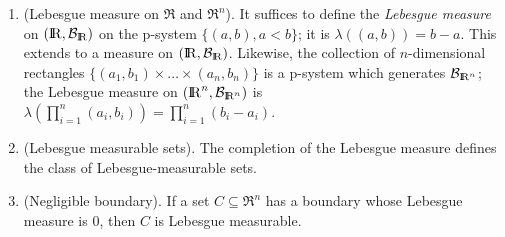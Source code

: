 \documentclass[a4paper,10pt]{article}
\begin{document}
\begin{enumerate}
 \item (Lebesgue measure on $\Re$ and $\Re^n$). It suffices to define the \textit{Lebesgue measure} on $(\Re,\B_\Re)$
       on the p-system $\{(a,b), a<b\}$; it is $\lambda((a,b))=b - a$. This extends to a measure on  $(\Re,\B_\Re)$.
       Likewise, the collection of $n$-dimensional rectangles $\{(a_1, b_1)\times\ldots \times (a_n, b_n)\}$ is a p-system
       which generates $\B_{\Re^n}$; the Lebesgue measure on $(\Re^n, \B_{\Re^n})$ is 
       $\lambda(\prod_{i=1}^n (a_i, b_i))=\prod_{i=1}^n (b_i-a_i)$.
 
 \item (Lebesgue measurable sets). The completion of the Lebesgue measure defines the class of Lebesgue-measurable
       sets. 
             
 \item (Negligible boundary). If a set $C\subseteq \Re^n$ has a boundary whose Lebesgue measure is $0$, then 
       $C$ is Lebesgue measurable.
\end{enumerate}
\end{document}

